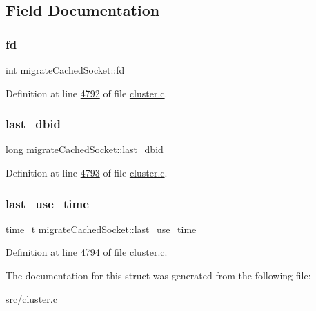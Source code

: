 \subsection{Field Documentation}
\mbox{\label{structmigrateCachedSocket_ad5eabf9f28e4efefc5eee6bc98f196b2}} 
\subsubsection{\texorpdfstring{fd}{fd}}
{\footnotesize\ttfamily int migrate\+Cached\+Socket\+::fd}



Definition at line \hyperlink{cluster_8c_source_l04792}{4792} of file \hyperlink{cluster_8c_source}{cluster.\+c}.

\mbox{\label{structmigrateCachedSocket_ae8fffd93c2175020f222656b75348299}} 
\subsubsection{\texorpdfstring{last\+\_\+dbid}{last\_dbid}}
{\footnotesize\ttfamily long migrate\+Cached\+Socket\+::last\+\_\+dbid}



Definition at line \hyperlink{cluster_8c_source_l04793}{4793} of file \hyperlink{cluster_8c_source}{cluster.\+c}.

\mbox{\label{structmigrateCachedSocket_a4f549c4b0f125417278e0cd832e97963}} 
\subsubsection{\texorpdfstring{last\+\_\+use\+\_\+time}{last\_use\_time}}
{\footnotesize\ttfamily time\+\_\+t migrate\+Cached\+Socket\+::last\+\_\+use\+\_\+time}



Definition at line \hyperlink{cluster_8c_source_l04794}{4794} of file \hyperlink{cluster_8c_source}{cluster.\+c}.



The documentation for this struct was generated from the following file\+:\begin{DoxyCompactItemize}
\item 
src/cluster.\+c\end{DoxyCompactItemize}
